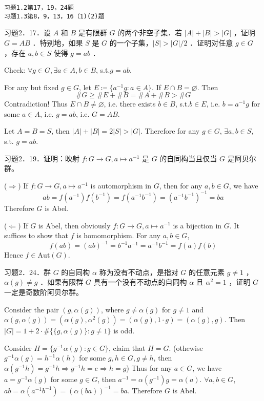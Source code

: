 \begin{lstlisting}
习题1.2第17，19，24题
习题1.3第8，9，13，16（1)(2)题
\end{lstlisting}
\begin{exercise}
习题2．17．设 $A$ 和 $B$ 是有限群 $G$ 的两个非空子集．若 $|A|+|B|>|G|$ ，证明 $G=A B$ ．特别地，如果 $S$ 是 $G$ 的一个子集，$|S|>|G| / 2$ ．证明对任意 $g \in G$ ，存在 $a, b \in S$ 使得 $g=a b$ ．
\end{exercise}
Check: $\forall g\in G,\exists a\in A, b\in B$, s.t.$g=ab$.

For any but fixed $g\in G$, let $E\coloneqq \{ a^{-1}g:a\in A \}$. If $E\cap B=\varnothing$. Then
\[
\#G\geq \#E+\#B=\#A+\#B>\#G
\]
Contradiction! Thus $E\cap B\neq \varnothing$, i.e. there exists $b\in B$, s.t.$b\in E$, i.e. $b=a^{-1}g$ for some $a\in A$, i.e. $g=ab$, i.e. $G=AB$.

Let $A=B=S$, then $\lvert A \rvert+\lvert B \rvert=2\lvert S \rvert>\lvert G \rvert$. Therefore for any $g\in G$, $\exists a, b\in S$, s.t. $g=ab$.

\begin{exercise}
习题2．19．证明：映射 $f: G \rightarrow G, a \mapsto a^{-1}$ 是 $G$ 的自同构当且仅当 $G$ 是阿贝尔群。
\end{exercise}
($\Rightarrow$) If $f:G\to G,a\mapsto a^{-1}$ is automorphism in $G$, then for any $a, b\in G$, we have
\[
ab=f(a^{-1})f(b^{-1})=f(a^{-1}b^{-1})=(a^{-1}b^{-1})^{-1}=ba
\]
Therefore $G$ is Abel.

($\Leftarrow$) If $G$ is Abel, then obviously $f:G\to G,a\mapsto a^{-1}$ is a bijection in $G$. It suffices to show that $f$ is homomorphism. For any $a, b\in G$,
\[
f(ab)=(ab)^{-1}=b^{-1}a^{-1}=a^{-1}b^{-1}=f(a)f(b)
\]
Hence $f\in \mathrm{Aut}(G)$.

\begin{exercise}
习题2．24．群 $G$ 的自同构 $\alpha$ 称为没有不动点，是指对 $G$ 的任意元素 $g \neq 1$ ， $\alpha(g) \neq g$ ．如果有限群 $G$ 具有一个没有不动点的自同构 $\alpha$ 且 $\alpha^2=1$ ，证明 $G$ 一定是奇数阶阿贝尔群。
\end{exercise}
Consider the pair $(g,\alpha(g))$, where $g\neq\alpha(g)$ for $g\neq1$ and $\alpha(g,\alpha(g))=(\alpha(g),\alpha^{2}(g))=(\alpha(g),1\cdot g)=(\alpha(g),g)$. Then $\lvert G \rvert=1+2\cdot\#\{ \{ g,\alpha(g) \}:g\neq1 \}$ is odd.

Consider $H=\{ g^{-1}\alpha(g):g\in G \}$, claim that $H=G$. (othewise $g^{-1}\alpha(g)=h^{-1}\alpha(h)$ for some $g, h\in G,g\neq h$, then $\alpha(g^{-1}h)=g^{-1}h\Rightarrow g^{-1}h=e\Rightarrow h=g$) Thus for any $a\in G$, we have $a=g^{-1}\alpha(g)$ for some $g\in G$, then $a^{-1}=\alpha(g^{-1})g=\alpha(a)$. $\forall a, b\in G$, $ab=\alpha(a^{-1}b^{-1})=(\alpha(ba))^{-1}=ba$. Therefore $G$ is Abel.

